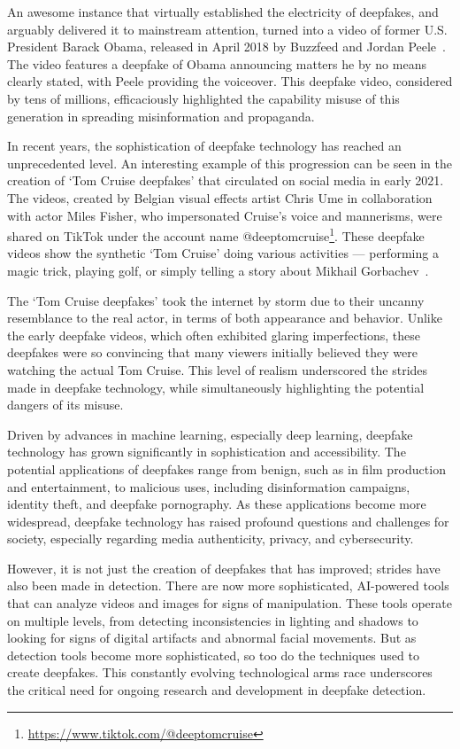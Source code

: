 An awesome instance that virtually established the electricity of deepfakes, 
and arguably delivered it to mainstream attention, turned into a video of former 
U.S. President Barack Obama, released in April 2018 by Buzzfeed and Jordan Peele~\cite{peele,10.1145/3371409}. 
The video features a deepfake of Obama announcing matters he by no means clearly 
stated, with Peele providing the voiceover. This deepfake video, considered by 
tens of millions, efficaciously highlighted the capability misuse of this generation 
in spreading misinformation and propaganda.

In recent years, the sophistication of deepfake technology has reached an unprecedented level. 
An interesting example of this progression can be seen in the creation of `Tom Cruise deepfakes' 
that circulated on social media in early 2021. The videos, created by Belgian visual effects 
artist Chris Ume in collaboration with actor Miles Fisher, who impersonated Cruise's voice 
and mannerisms, were shared on TikTok under the account name @deeptomcruise\footnote{\url{https://www.tiktok.com/@deeptomcruise}}. 
These deepfake videos show the synthetic `Tom Cruise' doing various activities --- performing 
a magic trick, playing golf, or simply telling a story about Mikhail Gorbachev~\cite{deeptomcruise}.

The `Tom Cruise deepfakes' took the internet by storm due to their uncanny resemblance to the 
real actor, in terms of both appearance and behavior. Unlike the early deepfake videos, which 
often exhibited glaring imperfections, these deepfakes were so convincing that many viewers 
initially believed they were watching the actual Tom Cruise. This level of realism underscored 
the strides made in deepfake technology, while simultaneously highlighting the potential 
dangers of its misuse.

Driven by advances in machine learning, especially deep learning, deepfake technology has
grown significantly in sophistication and accessibility. The potential applications of
deepfakes range from benign, such as in film production and entertainment, to malicious uses,
including disinformation campaigns, identity theft, and deepfake pornography. As these
applications become more widespread, deepfake technology has raised profound questions and
challenges for society, especially regarding media authenticity, privacy, and cybersecurity.

However, it is not just the creation of deepfakes that has improved; strides have also been made 
in detection. There are now more sophisticated, \ac{AI}-powered tools that can analyze videos 
and images for signs of manipulation. These tools operate on multiple levels, from detecting 
inconsistencies in lighting and shadows to looking for signs of digital artifacts and abnormal 
facial movements. But as detection tools become more sophisticated, so too do the techniques 
used to create deepfakes. This constantly evolving technological arms race underscores the 
critical need for ongoing research and development in deepfake detection.

